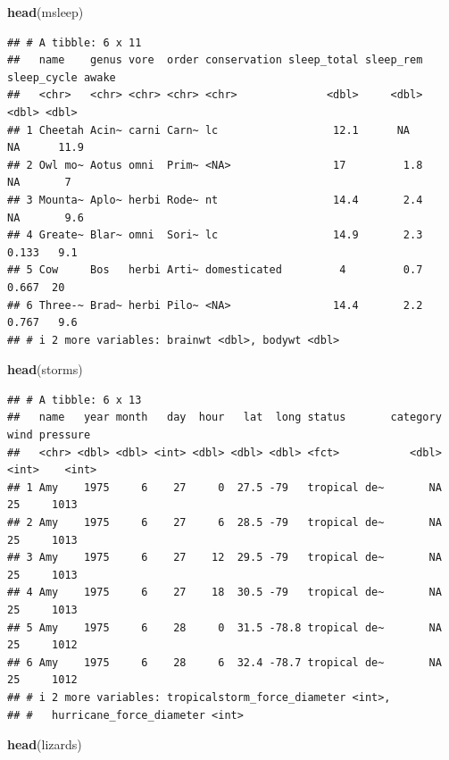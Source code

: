 \documentclass[
]{article}
\newenvironment{Shaded}{\begin{snugshade}}{\end{snugshade}}
\newcommand{\FunctionTok}[1]{\textcolor[rgb]{0.13,0.29,0.53}{\textbf{#1}}}
\newcommand{\NormalTok}[1]{#1}
\begin{document}
\begin{Shaded}
\begin{Highlighting}[]
\FunctionTok{head}\NormalTok{(msleep)}
\end{Highlighting}
\end{Shaded}

\begin{verbatim}
## # A tibble: 6 x 11
##   name    genus vore  order conservation sleep_total sleep_rem sleep_cycle awake
##   <chr>   <chr> <chr> <chr> <chr>              <dbl>     <dbl>       <dbl> <dbl>
## 1 Cheetah Acin~ carni Carn~ lc                  12.1      NA        NA      11.9
## 2 Owl mo~ Aotus omni  Prim~ <NA>                17         1.8      NA       7  
## 3 Mounta~ Aplo~ herbi Rode~ nt                  14.4       2.4      NA       9.6
## 4 Greate~ Blar~ omni  Sori~ lc                  14.9       2.3       0.133   9.1
## 5 Cow     Bos   herbi Arti~ domesticated         4         0.7       0.667  20  
## 6 Three-~ Brad~ herbi Pilo~ <NA>                14.4       2.2       0.767   9.6
## # i 2 more variables: brainwt <dbl>, bodywt <dbl>
\end{verbatim}

\begin{Shaded}
\begin{Highlighting}[]
\FunctionTok{head}\NormalTok{(storms)}
\end{Highlighting}
\end{Shaded}

\begin{verbatim}
## # A tibble: 6 x 13
##   name   year month   day  hour   lat  long status       category  wind pressure
##   <chr> <dbl> <dbl> <int> <dbl> <dbl> <dbl> <fct>           <dbl> <int>    <int>
## 1 Amy    1975     6    27     0  27.5 -79   tropical de~       NA    25     1013
## 2 Amy    1975     6    27     6  28.5 -79   tropical de~       NA    25     1013
## 3 Amy    1975     6    27    12  29.5 -79   tropical de~       NA    25     1013
## 4 Amy    1975     6    27    18  30.5 -79   tropical de~       NA    25     1013
## 5 Amy    1975     6    28     0  31.5 -78.8 tropical de~       NA    25     1012
## 6 Amy    1975     6    28     6  32.4 -78.7 tropical de~       NA    25     1012
## # i 2 more variables: tropicalstorm_force_diameter <int>,
## #   hurricane_force_diameter <int>
\end{verbatim}

\begin{Shaded}
\begin{Highlighting}[]
\FunctionTok{head}\NormalTok{(lizards)}
\end{Highlighting}
\end{Shaded}
\end{document}
